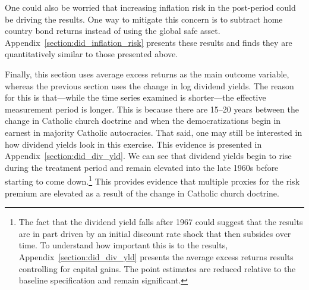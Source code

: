 One could also be worried that increasing inflation risk in the post-period could be driving the results. One way to mitigate this concern is to subtract home country bond returns instead of using the global safe asset. Appendix~\ref{section:did_inflation_risk} presents these results and finds they are quantitatively similar to those presented above.

Finally, this section uses average excess returns as the main outcome variable, whereas the previous section uses the change in log dividend yields. The reason for this is that---while the time series examined is shorter---the effective measurement period is longer. This is because there are 15--20 years between the change in Catholic church doctrine and when the democratizations begin in earnest in majority Catholic autocracies. That said, one may still be interested in how dividend yields look in this exercise. This evidence is presented in Appendix~\ref{section:did_div_yld}. We can see that dividend yields begin to rise during the treatment period and remain elevated into the late 1960s before starting to come down.\footnote{The fact that the dividend yield falls after 1967 could suggest that the results are in part driven by an initial discount rate shock that then subsides over time. To understand how important this is to the results, Appendix~\ref{section:did_div_yld} presents the average excess returns results controlling for capital gains. The point estimates are reduced relative to the baseline specification and remain significant.} This provides evidence that multiple proxies for the risk premium are elevated as a result of the change in Catholic church doctrine.